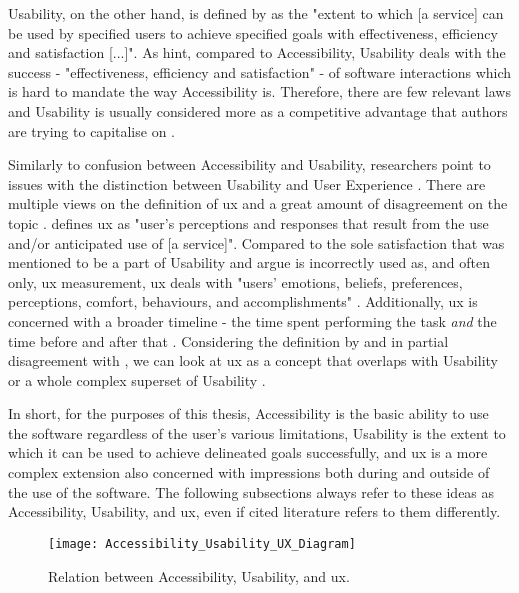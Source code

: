 Usability, on the other hand, is defined by \textcite{ISO_9241-11:2018} as the "extent to which [a service] can be used by specified users to achieve specified goals with effectiveness, efficiency and satisfaction [...]".
As \textcite{Wegge_Zimmermann_2007} hint, compared to Accessibility, Usability deals with the success - "effectiveness, efficiency and satisfaction" \parencite{ISO_9241-11:2018} - of software interactions which is hard to mandate the way Accessibility is.
Therefore, there are few relevant laws and Usability is usually considered more as a competitive advantage that authors are trying to capitalise on \parencite{Wegge_Zimmermann_2007}.

Similarly to confusion between Accessibility and Usability, researchers point to issues with the distinction between Usability and User Experience \parencite{Darin_et_all_2019, Juergen_et_all_2020}.
There are multiple views on the definition of \gls{ux} and a great amount of disagreement on the topic \parencite{Juergen_et_all_2020}.
\textcite{ISO_9241-11:2018} defines \gls{ux} as "user’s perceptions and responses that result from the use and/or anticipated use of [a service]".
Compared to the sole satisfaction that was mentioned to be a part of Usability and \textcite{Darin_et_all_2019} argue is incorrectly used as, and often only, \gls{ux} measurement, \gls{ux} deals with "users’ emotions, beliefs, preferences, perceptions, comfort, behaviours, and accomplishments" \parencite{ISO_9241-11:2018}.
Additionally, \gls{ux} is concerned with a broader timeline - the time spent performing the task \emph{and} the time before and after that \parencite{Juergen_et_all_2020,ISO_9241-11:2018}.
Considering the definition by \textcite{ISO_9241-11:2018} and in partial disagreement with \textcite{Darin_et_all_2019}, we can look at \gls{ux} as a concept that overlaps with Usability or a whole complex superset of Usability \parencite{Juergen_et_all_2020}.

In short, for the purposes of this thesis, Accessibility is the basic ability to use the software regardless of the user's various limitations, Usability is the extent to which it can be used to achieve delineated goals successfully, and \gls{ux} is a more complex extension also concerned with impressions both during and outside of the use of the software.
The following subsections always refer to these ideas as Accessibility, Usability, and \gls{ux}, even if cited literature refers to them differently.

\begin{figure}[H]
    \centering
    \texttt{[image: Accessibility\_Usability\_UX\_Diagram]}
    \caption{Relation between Accessibility, Usability, and \gls{ux}.}
    \label{fig:hsie-relations}
\end{figure}

